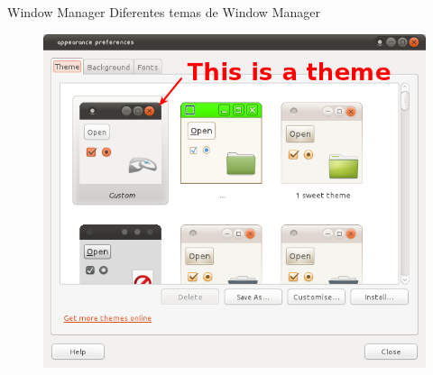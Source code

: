 \documentclass[size=14pt,
style=paintings
]{powerdot}
\begin{document}
\begin{slide}{Window Manager}
Diferentes temas de Window Manager
	\centering
	\begin{figure}[!h]
		\includegraphics[scale=0.35]{imagens/slide/windowManagerTheme}
	\end{figure}
\end{slide}
\end{document}
